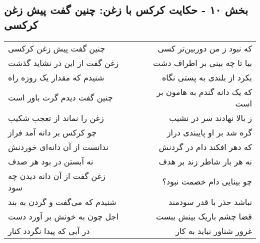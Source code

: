 \begin{center}
\section*{بخش ۱۰ - حکایت کرکس با زغن: چنین گفت پیش زغن کرکسی}
\label{sec:010}
\begin{longtable}{l p{0.5cm} r}
چنین گفت پیش زغن کرکسی
&&
که نبود ز من دوربین‌تر کسی
\\
زغن گفت از این در نشاید گذشت
&&
بیا تا چه بینی بر اطراف دشت
\\
شنیدم که مقدار یک روزه راه
&&
بکرد از بلندی به پستی نگاه
\\
چنین گفت دیدم گرت باور است
&&
که یک دانه گندم به هامون بر است
\\
زغن را نماند از تعجب شکیب
&&
ز بالا نهادند سر در نشیب
\\
چو کرکس بر دانه آمد فراز
&&
گره شد بر او پایبندی دراز
\\
ندانست از آن دانه‌ای خوردنش
&&
که دهر افکند دام در گردنش
\\
نه آبستن در بود هر صدف
&&
نه هر بار شاطر زند بر هدف
\\
زغن گفت از آن دانه دیدن چه سود
&&
چو بینایی دام خصمت نبود؟
\\
شنیدم که می‌گفت و گردن به بند
&&
نباشد حذر با قدر سودمند
\\
اجل چون به خونش بر آورد دست
&&
قضا چشم باریک بینش ببست
\\
در آبی که پیدا نگردد کنار
&&
غرور شناور نیاید به کار
\\
\end{longtable}
\end{center}
